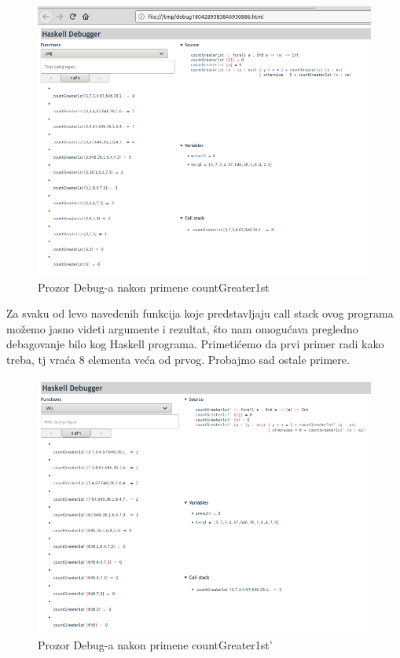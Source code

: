 \documentclass[a4paper]{article}
\begin{document}
{\begin{figure}[h!]
\begin{center}
\includegraphics[scale=0.4]{mitchell-browser-pregled.png}
\caption{Prozor Debug-a nakon primene countGreater1st}
\end{center}
\end{figure}

Za svaku od levo navedenih funkcija koje predstavljaju call stack ovog programa možemo jasno videti argumente i rezultat, što nam omogućava pregledno debagovanje bilo kog Haskell programa.
Primetićemo da prvi primer radi kako treba, tj vraća 8 elementa veća od prvog. Probajmo sad ostale primere.

\begin{figure}[h!]
\begin{center}
\includegraphics[scale=0.3]{mitchell-browser-pregled'.png}
\caption{Prozor Debug-a nakon primene countGreater1st'}
\end{center}
\end{figure}

}
\end{document}
